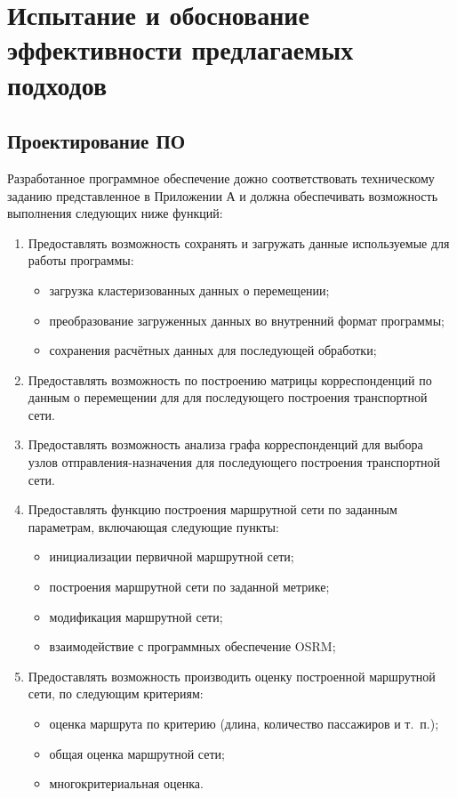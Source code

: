 \chapter{Испытание и обоснование эффективности предлагаемых подходов}
\section{Проектирование ПО}
Разработанное программное обеспечение дожно соответствовать техническому заданию представленное в Приложении 
А и должна обеспечивать возможность выполнения следующих ниже функций:
\begin{enumerate}
    \item Предоставлять возможность сохранять и загружать данные используемые для работы программы:
    \begin{itemize}
        \item загрузка кластеризованных данных о перемещении;
        \item преобразование загруженных данных во внутренний формат программы;
        \item сохранения расчётных данных для последующей обработки;
    \end{itemize}
    \item Предоставлять возможность по построению матрицы корреспонденций по данным о перемещении для 
        для последующего построения транспортной сети.
    \item Предоставлять возможность анализа графа корреспонденций для выбора узлов отправления-назначения для 
        последующего построения транспортной сети.
    \item Предоставлять функцию построения маршрутной сети по заданным параметрам, включающая следующие 
        пункты:
    \begin{itemize}
        \item инициализации первичной маршрутной сети;
        \item построения маршрутной сети по заданной метрике;
        \item модификация маршрутной сети;
        \item взаимодействие с программных обеспечение OSRM;
    \end{itemize}
    \item Предоставлять возможность производить оценку построенной маршрутной сети, по следующим критериям:
    \begin{itemize}
        \item оценка маршрута по критерию (длина, количество пассажиров и т.~п.);
        \item общая оценка маршрутной сети;
        \item многокритериальная оценка.
    \end{itemize}
\end{enumerate}

